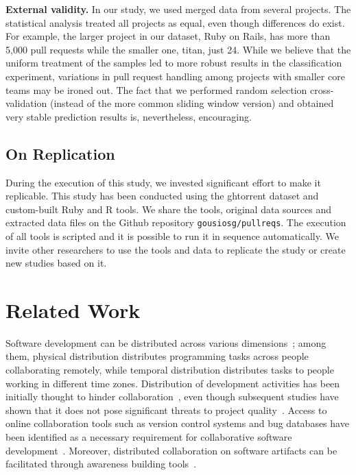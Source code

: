 \documentclass{acm_proc_article-sp}
\begin{document}
\textbf{External validity.}
In our study, we used merged data from several projects. The statistical
analysis treated all projects as equal, even though differences do exist.
For example, the larger project in our dataset, Ruby on Rails, 
has more than 5,000 pull requests while the smaller one, \textsf{titan}, just 24.
While we believe that the uniform treatment of the samples led to more robust
results in the classification experiment, variations in pull request
handling among projects with smaller core teams may be ironed out.
The fact that we performed random selection cross-validation (instead
of the more common sliding window version) and obtained very stable prediction
results is, nevertheless, encouraging.

\subsection{On Replication}
During the execution of this study, we invested significant effort to make it
replicable. This study has been conducted using the {\sc ght}orrent dataset and
custom-built Ruby and R tools. We share the tools, original data sources and
extracted data files on the Github repository \texttt{gousiosg/pullreqs}.  The
execution of all tools is scripted and it is possible to run it in sequence
automatically. We invite other researchers to use the tools and data to
replicate the study or create new studies based on it.

\section{Related Work}

Software development can be distributed across various
di\-men\-sions~\cite{Gumm06}; among them, physical distribution distributes
programming tasks across people collaborating remotely, while temporal
distribution distributes tasks to people working in different time zones.
Distribution of development activities has been initially thought to hinder
collaboration~\cite{Herbs99, Batti01}, even though subsequent studies have
shown that it does not pose significant threats to project
quality~\cite{Spine06, Nguye08, Bird09a}. Access to online collaboration tools
such as version control systems and bug databases have been identified as a necessary
requirement for collaborative software development~\cite{Catal06}. Moreover, distributed collaboration on software artifacts can be
facilitated through awareness building tools~\cite{Dabbi12, Lanza10}. 
\end{document}
